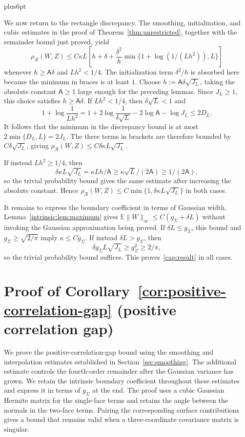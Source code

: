 \documentclass[11pt,letterpaper,twoside,leqno]{article}
\makeatletter
\theoremstyle{bookplain}
\theoremstyle{bookremark}
\renewenvironment{proof}[1][\proofname]{\par
  \pushQED{\qed}\normalfont\topsep6pt plus6pt\relax
  \trivlist\item[\hskip\labelsep\bfseries #1\@addpunct{.}]\ignorespaces
}{\popQED\endtrivlist\@endpefalse}
\newcommand{\E}{\mathbb E}
\newcommand{\rh}{\rho_{\mathcal R}}
\makeatother
\begin{document}
\begin{proof}[Proof of Proposition~\ref{prop:dimension-cap}]
We now return to the rectangle discrepancy. The smoothing,
initialization, and cubic estimates in the proof of
Theorem~\ref{thm:unrestricted}, together with the remainder
bound just proved, yield
\[
 \rh(W,Z)\le C\kappa L\left[
 h+\delta+\frac{\delta^2}h
       \min\{1+\log(1/(Lh^2)),L\}\right]
\]
whenever $h\ge\mathsf A\delta$ and $Lh^2<1/4$.
The initialization term $\delta^2/h$ is absorbed here because
the minimum in braces is at least $1$.
Choose $h:=\mathsf A\delta\sqrt{J_L}$, taking the absolute
constant $\mathsf A\ge1$ large enough for the preceding lemmas.
Since $J_L\ge1$, this choice satisfies $h\ge\mathsf A\delta$.
If $Lh^2<1/4$, then $\delta\sqrt L<1$ and
\[
 1+\log\frac1{Lh^2}
 =1+2\log\frac1{\delta\sqrt L}
       -2\log\mathsf A-\log J_L
 \le2D_L.
\]
It follows that the minimum in the discrepancy bound is at
most $2\min\{D_L,L\}=2J_L$.
The three terms in brackets are therefore bounded by
$C\delta\sqrt{J_L}$, giving
$\rh(W,Z)\le C\delta\kappa L\sqrt{J_L}$.

If instead $Lh^2\ge1/4$, then
\[
 \delta\kappa L\sqrt{J_L}
 =\kappa Lh/\mathsf A
 \ge\kappa\sqrt L/(2\mathsf A)\ge1/(2\mathsf A),
\]
so the trivial probability bound gives the same estimate after
increasing the absolute constant. Hence
$\rh(W,Z)\le C\min\{1,\delta\kappa L\sqrt{J_L}\}$ in both cases.

It remains to express the boundary coefficient in terms of Gaussian
width. Lemma~\ref{intrinsic:lem:maximum} gives
$\E\|W\|_\infty\le C(g_\Sigma+\delta L)$ without invoking
the Gaussian approximation being proved. If $\delta L\le g_\Sigma$,
this bound and $g_\Sigma\ge\sqrt{2/\pi}$ imply
$\kappa\le Cg_\Sigma$. If instead $\delta L>g_\Sigma$, then
\[
 \delta g_\Sigma L\sqrt{J_L}\ge g_\Sigma^2\ge2/\pi,
\]
so the trivial probability bound suffices.
This proves~\eqref{cap:result} in all cases.
\end{proof}

\clearpage
\section{Proof of Corollary~\ref*{cor:positive-correlation-gap} (positive correlation gap)}
\label{app:correlation-gap-proof}

We prove the positive-correlation-gap bound using the smoothing and
interpolation estimates established in Section~\ref{sec:smoothing}.
The additional estimate controls the fourth-order remainder after the
Gaussian variance has grown. We retain the intrinsic boundary coefficient
throughout these estimates and express it in terms of $g_\Sigma$ at the end.
The proof uses a cubic Gaussian Hermite
matrix for the single-face terms and retains the angle between the
normals in the two-face terms. Pairing the corresponding surface
contributions gives a bound that remains valid when a three-coordinate
covariance matrix is singular.
\end{document}
